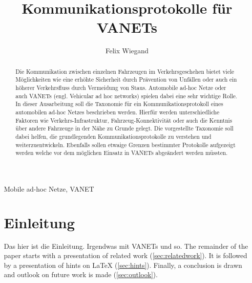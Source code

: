 \documentclass[english,runningheads,a4paper]{llncs}[2018/03/10]
\begin{document}
\title{Kommunikationsprotokolle für VANETs}

\author{Felix Wiegand}

%
%

\maketitle

\begin{abstract}
  Die Kommunikation zwischen einzelnen Fahrzeugen im Verkehrsgeschehen bietet viele Möglichkeiten wie eine erhöhte Sicherheit durch Prävention von Unfällen oder auch ein höherer Verkehrsfluss durch Vermeidung von Staus.
  Automobile ad-hoc Netze oder auch VANETs (engl. Vehicular ad hoc networks) spielen dabei eine sehr wichtige Rolle.
  In dieser Ausarbeitung soll die Taxonomie für ein Kommunikationsprotokoll eines automobilen ad-hoc Netzes beschrieben werden.
  Hierfür werden unterschiedliche Faktoren wie Verkehrs-Infrastruktur, Fahrzeug-Konnektivität oder auch die Kenntnis über andere Fahrzeuge in der Nähe zu Grunde gelegt.
  Die vorgestellte Taxonomie soll dabei helfen, die grundlegenden Kommunikationsprotokolle zu verstehen und weiterzuentwickeln.
  Ebenfalls sollen etwaige Grenzen bestimmter Protokolle aufgezeigt werden welche vor dem möglichen Einsatz in VANETs abgeändert werden müssten\cite{conti2013mobile}.
\end{abstract}

\begin{keywords}
  Mobile ad-hoc Netze, VANET
\end{keywords}

\section{Einleitung}\label{sec:intro}

  Das hier ist die Einleitung. Irgendwas mit VANETs und so.
  The remainder of the paper starts with a presentation of related work (\cref{sec:relatedwork}).
  It is followed by a presentation of hints on \LaTeX{} (\cref{sec:hints}).
  Finally, a conclusion is drawn and outlook on future work is made (\cref{sec:outlook}).
\end{document}
